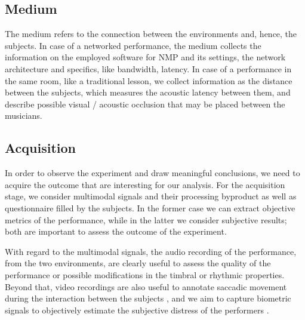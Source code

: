 \subsection{Medium}
The medium refers to the connection between the environments and, hence, the subjects. In case of a networked performance, the medium collects the information on the employed software for NMP and its settings, the network architecture and specifics, like bandwidth, latency. In case of a performance in the same room, like a traditional lesson, we collect information as the distance between the subjects, which measures the acoustic latency between them, and describe possible visual / acoustic occlusion that may be placed between the musicians. 

\subsection{Acquisition}
In order to observe the experiment and draw meaningful conclusions, we need to acquire the outcome that are interesting for our analysis. For the acquisition stage, we consider multimodal signals and their processing byproduct as well as questionnaire filled by the subjects. In the former case we can extract objective metrics of the performance, while in the latter we consider subjective results; both are important to assess the outcome of the experiment. 

With regard to the multimodal signals, the audio recording of the performance, from the two environments, are clearly useful to assess the quality of the performance or possible modifications in the timbral or rhythmic properties. Beyond that, video recordings are also useful to annotate saccadic movement during the interaction between the subjects \cite{vandemoortele2018gazing}, and we aim to capture biometric signals to objectively estimate the subjective distress of the performers \cite{Yoshie2009}. 
